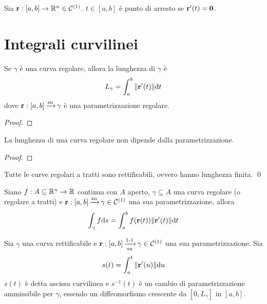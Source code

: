 \begin{definition}
	Sia $\vb{r} :[a,b] \to \mathbb{R}^n\in \mathcal{C}^{(1)}$. $t \in [a,b]$ è punto di arresto se $\vb{r}'(t) = \vb{0}$.
\end{definition}

\section{Integrali curvilinei}

\begin{theorem}
	Se $\gamma$ è una curva regolare, allora la lunghezza di $\gamma$ è
	$$
		L_\gamma = \int_a^b\norm{\vb{r}'(t)}\dd t
	$$
	dove $\vb{r}: [a,b]\operatorname{\xrightarrow{\operatorname{su}}} \gamma$ è una parametrizzazione regolare.
\end{theorem}

\begin{proof}
\end{proof}

\begin{prop}
	La lunghezza di una curva regolare non dipende dalla parametrizzazione.
\end{prop}

\begin{proof}
\end{proof}

\begin{prop}
	Tutte le curve regolari a tratti sono rettificabili, ovvero hanno lunghezza finita.
	\qed
\end{prop}

\begin{definition}
	Siano $f: A\subseteq\mathbb{R}^n \to \mathbb{R}$ continua con $A$ aperto, $\gamma \subseteq A$ una curva regolare (o regolare a tratti) e $\vb{r}:[a,b]\operatorname{\xrightarrow{\operatorname{su}}} \gamma \in \mathcal{C}^{(1)}$ una sua parametrizzazione, allora
	$$
		\int_\gamma f \dd s = \int_a^b f(\vb{r}(t))\norm{\vb{r}'(t)}\dd t
	$$
\end{definition}

\begin{definition}
	Sia $\gamma$ una curva rettificabile e $\vb{r}:[a,b]\operatorname{\xrightarrow[\operatorname{su}]{\operatorname{1-1}}}\gamma \in \mathcal{C}^{(1)}$ una sua parametrizzazione. Sia
	$$
		s(t)=\int_a^t\norm{\vb{r}'(u)}\dd u
	$$
	$s(t)$ è detta ascissa curvilinea e $s^{-1}(t)$ è un cambio di parametrizzazione ammissibile per $\gamma$, essendo un diffeomorfismo crescente da $[0,L_\gamma]$ in $[a,b]$.
\end{definition}

